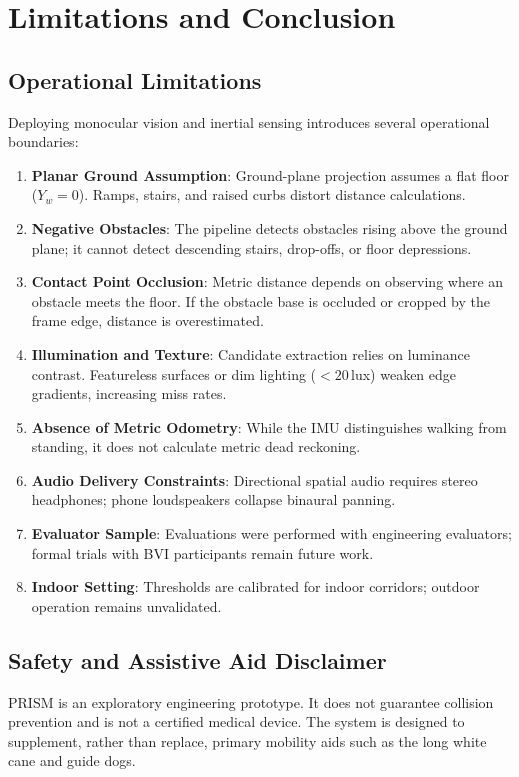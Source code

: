 \section{Limitations and Conclusion}
\label{sec:limitations_conclusion}

\subsection{Operational Limitations}
\label{sec:limitations}
Deploying monocular vision and inertial sensing introduces several operational boundaries:
\begin{enumerate}
    \item \textbf{Planar Ground Assumption}: Ground-plane projection assumes a flat floor ($Y_w = 0$). Ramps, stairs, and raised curbs distort distance calculations.
    \item \textbf{Negative Obstacles}: The pipeline detects obstacles rising above the ground plane; it cannot detect descending stairs, drop-offs, or floor depressions.
    \item \textbf{Contact Point Occlusion}: Metric distance depends on observing where an obstacle meets the floor. If the obstacle base is occluded or cropped by the frame edge, distance is overestimated.
    \item \textbf{Illumination and Texture}: Candidate extraction relies on luminance contrast. Featureless surfaces or dim lighting ($< 20$\,lux) weaken edge gradients, increasing miss rates.
    \item \textbf{Absence of Metric Odometry}: While the IMU distinguishes walking from standing, it does not calculate metric dead reckoning.
    \item \textbf{Audio Delivery Constraints}: Directional spatial audio requires stereo headphones; phone loudspeakers collapse binaural panning.
    \item \textbf{Evaluator Sample}: Evaluations were performed with engineering evaluators; formal trials with BVI participants remain future work.
    \item \textbf{Indoor Setting}: Thresholds are calibrated for indoor corridors; outdoor operation remains unvalidated.
\end{enumerate}

\subsection{Safety and Assistive Aid Disclaimer}
\label{sec:safety_disclaimer}
PRISM is an exploratory engineering prototype. It does not guarantee collision prevention and is not a certified medical device. The system is designed to supplement, rather than replace, primary mobility aids such as the long white cane and guide dogs.

